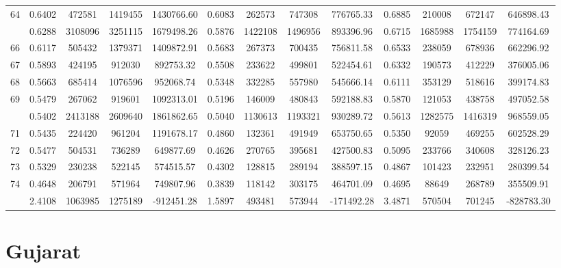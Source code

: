 \documentclass[
  12pt,
]{article}
\begin{document}
\begin{longtable}[t]{lcccccccccccc}
64 & 0.6402 & 472581 & 1419455 & 1430766.60 & 0.6083 & 262573 & 747308 & 776765.33 & 0.6885 & 210008 & 672147 & 646898.43\\
\addlinespace
65 & 0.6288 & 3108096 & 3251115 & 1679498.26 & 0.5876 & 1422108 & 1496956 & 893396.96 & 0.6715 & 1685988 & 1754159 & 774164.69\\
66 & 0.6117 & 505432 & 1379371 & 1409872.91 & 0.5683 & 267373 & 700435 & 756811.58 & 0.6533 & 238059 & 678936 & 662296.92\\
67 & 0.5893 & 424195 & 912030 & 892753.32 & 0.5508 & 233622 & 499801 & 522454.61 & 0.6332 & 190573 & 412229 & 376005.06\\
68 & 0.5663 & 685414 & 1076596 & 952068.74 & 0.5348 & 332285 & 557980 & 545666.14 & 0.6111 & 353129 & 518616 & 399174.83\\
69 & 0.5479 & 267062 & 919601 & 1092313.01 & 0.5196 & 146009 & 480843 & 592188.83 & 0.5870 & 121053 & 438758 & 497052.58\\
\addlinespace
70 & 0.5402 & 2413188 & 2609640 & 1861862.65 & 0.5040 & 1130613 & 1193321 & 930289.72 & 0.5613 & 1282575 & 1416319 & 968559.05\\
71 & 0.5435 & 224420 & 961204 & 1191678.17 & 0.4860 & 132361 & 491949 & 653750.65 & 0.5350 & 92059 & 469255 & 602528.29\\
72 & 0.5477 & 504531 & 736289 & 649877.69 & 0.4626 & 270765 & 395681 & 427500.83 & 0.5095 & 233766 & 340608 & 328126.23\\
73 & 0.5329 & 230238 & 522145 & 574515.57 & 0.4302 & 128815 & 289194 & 388597.15 & 0.4867 & 101423 & 232951 & 280399.54\\
74 & 0.4648 & 206791 & 571964 & 749807.96 & 0.3839 & 118142 & 303175 & 464701.09 & 0.4695 & 88649 & 268789 & 355509.91\\
\addlinespace
75 & 2.4108 & 1063985 & 1275189 & -912451.28 & 1.5897 & 493481 & 573944 & -171492.28 & 3.4871 & 570504 & 701245 & -828783.30\\*
\end{longtable}
\endgroup{}

\pagebreak

\hypertarget{gujarat}{%
\section{Gujarat}\label{gujarat}}

\begingroup\fontsize{9.7}{11.7}\selectfont
\end{document}
